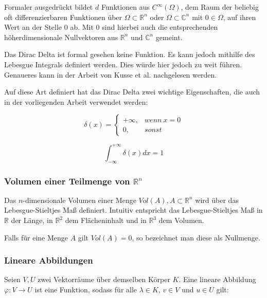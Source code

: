 \documentclass[a4paper,fontsize=12pt,toc=bib,parskip=half,ngerman]{scrartcl}
\begin{document}
Formaler ausgedr\"uckt bildet $d$ Funktionen aus $C^{\infty}(\Omega)$, dem Raum der beliebig oft differenzierbaren Funktionen \"uber $\Omega \subset \mathbb{R}^n$ oder $\Omega \subset \mathbb{C}^n$ mit $0 \in \Omega$, auf ihren Wert an der Stelle 0 ab. Mit 0 sind hierbei auch die entsprechenden h\"oherdimensionale Nullvektoren aus $\mathbb{R}^n$ und $\mathbb{C}^n$ gemeint.

Das Dirac Delta ist formal gesehen keine Funktion. Es kann jedoch mithilfe des Lebesgue Integrals definiert werden. Dies w\"urde hier jedoch zu weit f\"uhren. Genaueres kann in der Arbeit von Kusse et al. \cite[S.~100~ff.]{kusse2010mathematical} nachgelesen werden.

Auf diese Art definiert hat das Dirac Delta zwei wichtige Eigenschaften, die auch in der vorliegenden Arbeit verwendet werden:

\begin{equation}
	\delta(x)=
	\left\{
	\begin{array}{ll}
		+\infty, & wenn~x = 0\\
		0, & sonst
	\end{array}
	\right.
\end{equation}

\begin{equation}
	\int_{-\infty}^{+\infty}\delta(x)dx = 1
\end{equation}

\subsubsection{Volumen einer Teilmenge von \texorpdfstring{$\mathbb{R}^n$}{}}
Das $n$-dimensionale Volumen einer Menge $Vol(A), A \subset \mathbb{R}^n$ wird \"uber das Lebesgue-Stieltjes Ma{\ss} definiert\cite{kusolitsch2014mass}. Intuitiv entspricht das Lebesgue-Stieltjes Ma{\ss} in $\mathbb{R}$ der L\"ange, in $\mathbb{R}^2$ dem Fl\"acheninhalt und in $\mathbb{R}^3$ dem Volumen.

Falls f\"ur eine Menge $A$ gilt $Vol(A)=0$, so bezeichnet man diese als Nullmenge.

\subsubsection{Lineare Abbildungen}
Seien $V,U$ zwei Vektorr\"aume \"uber demselben K\"orper $K$. Eine lineare Abbildung $\varphi: V \rightarrow U$ ist eine Funktion, sodass f\"ur alle $\lambda \in K$, $v \in V$ und $u \in U$ gilt\cite[S.~85]{bowen2008introduction}:
\end{document}
